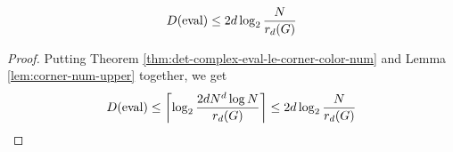 \begin{corollary}
  \label{cor:det-complex-eval-le-corner-free-num}

  $$D(\operatorname{eval}) \le 2d\log_2\frac N{r_d(G)}$$ %
\end{corollary}
\begin{proof}

  Putting Theorem \ref{thm:det-complex-eval-le-corner-color-num} and Lemma \ref{lem:corner-num-upper} together, we get
  $$D(\operatorname{eval}) \le \left\lceil \log_2\frac{2dN^d\log N}{r_d(G)}\right\rceil \le 2d\log_2\frac N{r_d(G)}$$
\end{proof}

